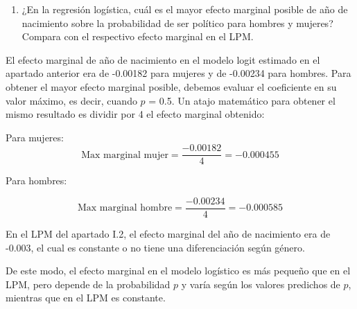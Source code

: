 \documentclass[
  12pt,
  a4paper,
]{article}
\providecommand{\tightlist}{%
  \setlength{\itemsep}{0pt}\setlength{\parskip}{0pt}}
\begin{document}
\begin{enumerate}
\def\labelenumi{\arabic{enumi}.}
\setcounter{enumi}{2}
\tightlist
\item
  ¿En la regresión logística, cuál es el mayor efecto marginal posible de año de nacimiento sobre la probabilidad de ser político para hombres y mujeres? Compara con el respectivo efecto marginal en el LPM.
\end{enumerate}

El efecto marginal de año de nacimiento en el modelo logit estimado en el apartado anterior era de -0.00182 para mujeres y de -0.00234 para hombres. Para obtener el mayor efecto marginal posible, debemos evaluar el coeficiente en su valor máximo, es decir, cuando \(p\) = 0.5. Un atajo matemático para obtener el mismo resultado es dividir por 4 el efecto marginal obtenido:

Para mujeres:
\[
\text{Max marginal mujer} = \frac{-0.00182}{4} = -0.000455
\]

Para hombres:

\[
\text{Max marginal hombre} = \frac{-0.00234}{4} = -0.000585
\]

En el LPM del apartado I.2, el efecto marginal del año de nacimiento era de -0.003, el cual es constante o no tiene una diferenciación según género.

De este modo, el efecto marginal en el modelo logístico es más pequeño que en el LPM, pero depende de la probabilidad \(p\) y varía según los valores predichos de \(p\), mientras que en el LPM es constante.
\end{document}
